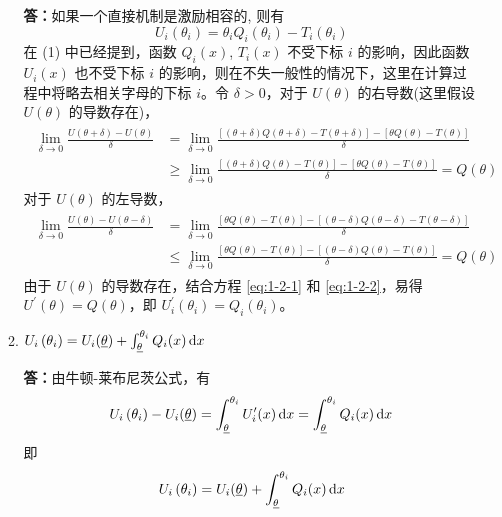 \documentclass[UTF8]{article} %
\begin{document}
\begin{enumerate}
\begin{enumerate}
        \textbf{答：}如果一个直接机制是激励相容的, 则有
        \[ U_i(\theta_i) = \theta_i Q_i(\theta_i) - T_i(\theta_i) \]
        在 (1) 中已经提到，函数 $Q_i(x)$, $T_i(x)$ 不受下标 $i$ 的影响，因此函数 $U_i(x)$ 也不受下标 $i$ 的影响，则在不失一般性的情况下，这里在计算过程中将略去相关字母的下标 $i$。令 $\delta>0$，对于 $U(\theta)$ 的右导数(这里假设 $U(\theta)$ 的导数存在)，
        \begin{gather}
            \begin{split}
                \lim_{\delta\to 0} \frac{U(\theta+\delta) - U(\theta)}{\delta} &= \lim_{\delta\to 0} \frac{ \left[ (\theta+\delta)Q(\theta+\delta) - T(\theta+\delta) \right] -\left[ \theta Q(\theta) - T(\theta) \right]}{\delta} \\
                &\geq \lim_{\delta\to 0} \frac{ \left[ (\theta+\delta)Q(\theta) - T(\theta) \right] -\left[ \theta Q(\theta) - T(\theta) \right]}{\delta} = Q(\theta)
            \end{split} \label{eq:1-2-1}
        \end{gather}
        对于 $U(\theta)$ 的左导数，
        \begin{gather}
            \begin{split}
                \lim_{\delta\to 0} \frac{U(\theta) - U(\theta-\delta)}{\delta} &= \lim_{\delta\to 0} \frac{ \left[ \theta Q(\theta) - T(\theta) \right] - \left[ (\theta-\delta)Q(\theta-\delta) - T(\theta-\delta) \right]}{\delta} \\
                &\leq \lim_{\delta\to 0} \frac{ \left[ \theta Q(\theta) - T(\theta) \right] - \left[ (\theta-\delta)Q(\theta) - T(\theta) \right]}{\delta} = Q(\theta)
            \end{split} \label{eq:1-2-2}
        \end{gather}
        由于 $U(\theta)$ 的导数存在，结合方程 \eqref{eq:1-2-1} 和 \eqref{eq:1-2-2}，易得 $U^\prime(\theta) = Q(\theta)$，即 $U_i^\prime(\theta_i) = Q_i(\theta_i)$。
        
        \item $U_{i}\left(\theta_{i}\right)=U_{i}(\underline{\theta})+\int_{\underline{\theta}}^{\theta_{i}} Q_{i}(x) \operatorname{d\!} x$
        
        \textbf{答：}由牛顿-莱布尼茨公式，有
        \[ U_{i}\left(\theta_{i}\right) - U_{i}(\underline{\theta}) = \int_{\underline{\theta}}^{\theta_{i}} U^\prime_{i}(x) \operatorname{d\!} x = \int_{\underline{\theta}}^{\theta_{i}} Q_{i}(x) \operatorname{d\!} x \]
        即
        \begin{gather}
        U_{i}\left(\theta_{i}\right)=U_{i}(\underline{\theta})+\int_{\underline{\theta}}^{\theta_{i}} Q_{i}(x) \operatorname{d\!} x \label{eq:1-3-1}
        \end{gather}
        

\end{enumerate}
\end{enumerate}
\end{document}
